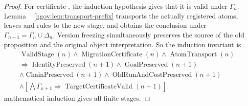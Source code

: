 \documentclass[12pt,a4paper,openany,notitlepage]{report}
\theoremstyle{plain}
\theoremstyle{definition}
\theoremstyle{remark}
\begin{document}
\begin{CJK*}
\begin{proof}
For certificate , the induction hypothesis gives that it is valid under $\Gamma_n$. Lemma ~ \ref{hgov:lem:transport-prefix} transports the actually registered atoms, leaves and rules to the new stage, and obtains the conclusion under $\Gamma_{n+1}=\Gamma_n\cup\Delta_n$. Version freezing simultaneously preserves the source of the old proposition and the original object interpretation. So the induction invariant is \[
\begin{gathered}
\operatorname{ValidStage}(n)\land\operatorname{MigrationCertificate}(n)
\land\operatorname{AtomTransport}(n)\\
\Rightarrow
\operatorname{IdentityPreserved}(n+1)
\land\operatorname{GoalPreserved}(n+1)\\
\land\operatorname{ChainPreserved}(n+1)
\land\operatorname{OldRunAndCostPreserved}(n+1)\\
\land
\left[\bigwedge\Gamma_{n+1}
\Rightarrow\operatorname{TargetCertificateValid}(n+1)\right].
\end{gathered}
\] mathematical induction gives all finite stages.\end{proof}



\end{CJK*}
\end{document}
